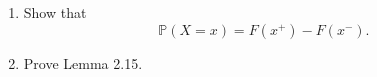 \documentclass{article}
\begin{document}
\begin{enumerate}

\item Show that
  \[\mathbb{P}(X=x)=F(x^+)-F(x^-).\]



\item Prove Lemma 2.15.



\end{enumerate}
\end{document}
